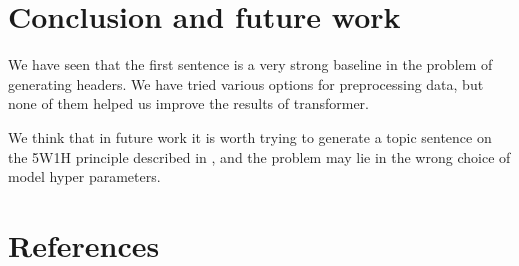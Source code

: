 \documentclass{dialogue}
\begin{document}
\section{Conclusion and future work}
We have seen that the first sentence is a very strong baseline in the problem of generating headers. We have tried various options for preprocessing data, but none of them helped us improve the results of transformer.

We think that in future work it is worth trying to generate a topic sentence on the 5W1H principle described in \cite{}, and the problem may lie in the wrong choice of model hyper parameters.


\color{blue}\section*{References}

\makeatletter
\renewcommand{\section}{\@gobbletwo}
\makeatother

\end{document}
